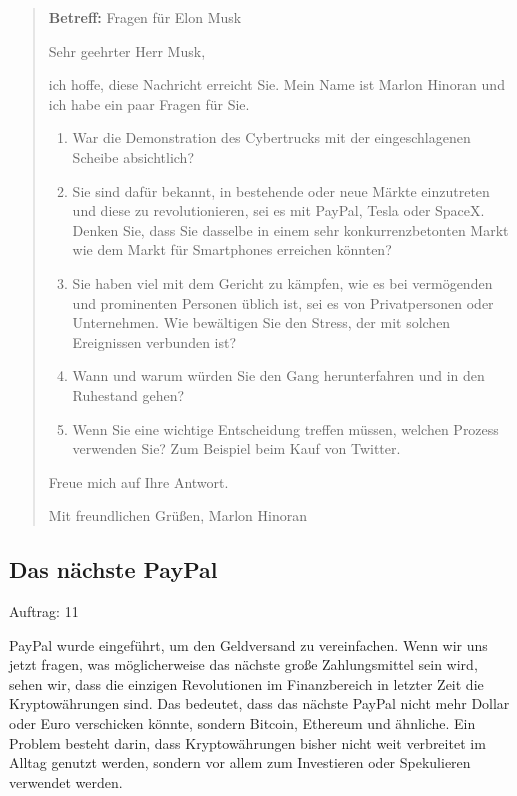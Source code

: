 \documentclass[10pt]{article}
\begin{document}
\begin{quote}
    \textbf{Betreff:} Fragen für Elon Musk
    
    Sehr geehrter Herr Musk,
    
    ich hoffe, diese Nachricht erreicht Sie. Mein Name ist Marlon Hinoran und ich habe ein paar Fragen für Sie.
    
    \begin{enumerate}
        \item War die Demonstration des Cybertrucks mit der eingeschlagenen Scheibe absichtlich?
        \item Sie sind dafür bekannt, in bestehende oder neue Märkte einzutreten und diese zu revolutionieren, sei es mit PayPal, Tesla oder SpaceX. Denken Sie, dass Sie dasselbe in einem sehr konkurrenzbetonten Markt wie dem Markt für Smartphones erreichen könnten?
        \item Sie haben viel mit dem Gericht zu kämpfen, wie es bei vermögenden und prominenten Personen üblich ist, sei es von Privatpersonen oder Unternehmen. Wie bewältigen Sie den Stress, der mit solchen Ereignissen verbunden ist?
        \item Wann und warum würden Sie den Gang herunterfahren und in den Ruhestand gehen?
        \item Wenn Sie eine wichtige Entscheidung treffen müssen, welchen Prozess verwenden Sie? Zum Beispiel beim Kauf von Twitter.
    \end{enumerate}
    
    Freue mich auf Ihre Antwort.
    
    Mit freundlichen Grüßen,
    Marlon Hinoran
\end{quote}

\subsection*{Das nächste PayPal}

\begin{description}
    \item[Auftrag: 11]
\end{description}

PayPal wurde eingeführt, um den Geldversand zu vereinfachen. Wenn wir uns jetzt fragen, was möglicherweise das nächste große Zahlungsmittel sein wird, sehen wir, dass die einzigen Revolutionen im Finanzbereich in letzter Zeit die Kryptowährungen sind. Das bedeutet, dass das nächste PayPal nicht mehr Dollar oder Euro verschicken könnte, sondern Bitcoin, Ethereum und ähnliche. Ein Problem besteht darin, dass Kryptowährungen bisher nicht weit verbreitet im Alltag genutzt werden, sondern vor allem zum Investieren oder Spekulieren verwendet werden.
\end{document}
